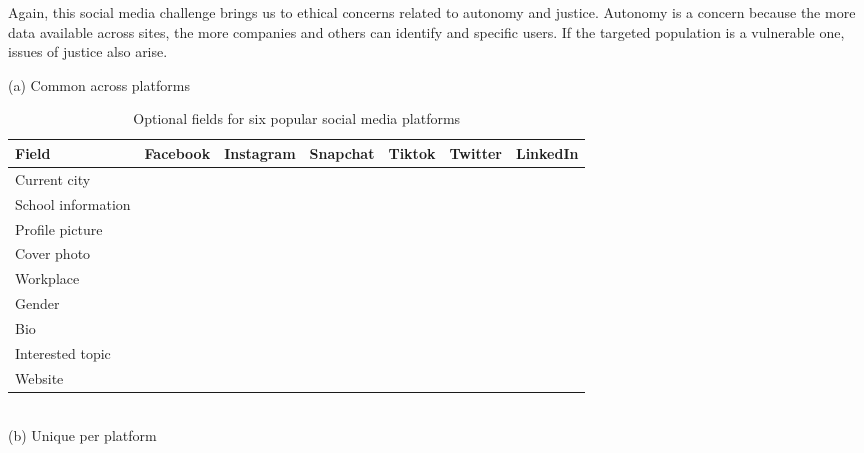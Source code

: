 \documentclass[11pt]{article} %
\newcommand{\cmark}{\ding{51}}%
\begin{document}
Again, this social media challenge brings us to ethical concerns related to autonomy and justice. 
Autonomy is a concern because the more data available across sites, the more companies and others can identify and specific users. If the targeted population is a vulnerable one, issues of justice also arise. 


\begin{table}[tb]
\centering
\small
    \caption{Optional fields for six popular social media platforms}
    \label{tab:optional}

    \vspace{1em}
       (a) Common across platforms\\
    \vspace{1em}
            \begin{tabular}{lcccccc} 
            \toprule
Field &   Facebook &   Instagram &   Snapchat &   Tiktok &   Twitter &   LinkedIn \\ \midrule    
Current city       & \cmark &        &  &        & \cmark & \cmark \\ \hline 
School information & \cmark &        &  &        & \cmark & \cmark \\ \hline 
Profile picture    & \cmark & \cmark &  & \cmark & \cmark & \cmark \\ \hline
Cover photo        & \cmark &        &  &        & \cmark & \cmark \\ \hline
Workplace          & \cmark &        &  &        &        & \cmark \\ \hline
Gender             & \cmark & \cmark &  &        &        &        \\ \hline
Bio                & \cmark & \cmark &  &        & \cmark & \cmark \\ \hline
Interested topic   &        &        &  &        & \cmark & \cmark \\ \hline
Website            & \cmark &        &  &        & \cmark &       \\ \bottomrule
            \end{tabular} \\
    \vspace{1em}
        \centering
    \vspace{1em} 
        (b) Unique per platform\\
    \vspace{1em}
                             

\end{table}
\end{document}
